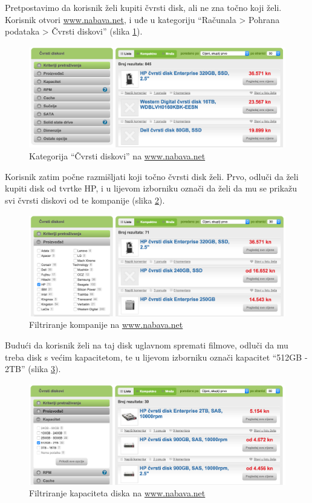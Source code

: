 \documentclass[a4paper,twoside,12pt]{scrreprt}
\begin{document}
Pretpostavimo da korisnik želi kupiti čvrsti disk, ali ne zna točno koji želi. Korisnik otvori \url{www.nabava.net}, i uđe u kategoriju ``Računala > Pohrana podataka > Čvrsti diskovi'' (slika \ref{nabava1}).

\begin{figure}[H]
  \centering
  \includegraphics[width=\textwidth]{nabava1}
  \caption{Kategorija ``Čvrsti diskovi'' na \url{www.nabava.net}}
  \label{nabava1}
\end{figure}

Korisnik zatim počne razmišljati koji točno čvrsti disk želi. Prvo, odluči da želi kupiti disk od tvrtke HP, i u lijevom izborniku označi da želi da mu se prikažu svi čvrsti diskovi od te kompanije (slika \ref{nabava2}).

\begin{figure}[H]
  \centering
  \includegraphics[width=\textwidth]{nabava2}
  \caption{Filtriranje kompanije na \url{www.nabava.net}}
  \label{nabava2}
\end{figure}

Budući da korisnik želi na taj disk uglavnom spremati filmove, odluči da mu treba disk s većim kapacitetom, te u lijevom izborniku označi kapacitet ``512GB - 2TB'' (slika \ref{nabava3}).

\begin{figure}[H]
  \centering
  \includegraphics[width=\textwidth]{nabava3}
  \caption{Filtriranje kapaciteta diska na \url{www.nabava.net}}
  \label{nabava3}
\end{figure}
\end{document}
